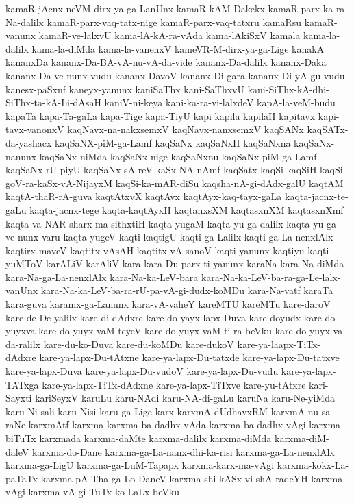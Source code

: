 {kamaR-jAcnx-neVM-dirx-ya-ga-LanUnx
kamaR-kAM-Dakekx
kamaR-parx-ka-ra-Na-dalilx
kamaR-parx-vaq-tatx-nige
kamaR-parx-vaq-tatxru
kamaRsu
kamaR-vanunx
kamaR-ve-lalxvU
kama-lA-kA-ra-vAda
kama-lAkiSxV
kamala
kama-la-dalilx
kama-la-diMda
kama-la-vanenxV
kameVR-M-dirx-ya-ga-Lige
kanakA
kananxDa
kananx-Da-BA-vA-nu-vA-da-vide
kananx-Da-dalilx
kananx-Daka
kananx-Da-ve-nunx-vudu
kananx-DavoV
kananx-Di-gara
kananx-Di-yA-gu-vudu
kanesx-paSxnf
kaneyx-yanunx
kaniSaThx
kani-SaThxvU
kani-SiThx-kA-dhi-SiThx-ta-kA-Li-dAsaH
kaniV-ni-keya
kani-ka-ra-vi-lalxdeV
kapA-la-veM-budu
kapaTa
kapa-Ta-gaLa
kapa-Tige
kapa-TiyU
kapi
kapila
kapilaH
kapitavx
kapi-tavx-vanonxV
kaqNavx-na-nakxsemxV
kaqNavx-nanxsemxV
kaqSANx
kaqSATx-da-yashacx
kaqSaNX-piM-ga-Lamf
kaqSaNx
kaqSaNxH
kaqSaNxna
kaqSaNx-nanunx
kaqSaNx-niMda
kaqSaNx-nige
kaqSaNxnu
kaqSaNx-piM-ga-Lamf
kaqSaNx-rU-piyU
kaqSaNx-sA-reV-kaSx-NA-nAmf
kaqSatx
kaqSi
kaqSiH
kaqSi-goV-ra-kaSx-vA-NijayxM
kaqSi-ka-mAR-diSu
kaqsha-nA-gi-dAdx-galU
kaqtAM
kaqtA-thaR-rA-guva
kaqtAtxvX
kaqtAvx
kaqtAyx-kaq-tayx-gaLa
kaqta-jacnx-te-gaLu
kaqta-jacnx-tege
kaqta-kaqtAyxH
kaqtanxsXM
kaqtasxnXM
kaqtasxnXmf
kaqta-va-NAR-sharx-ma-sithxtiH
kaqta-yugaM
kaqta-yu-ga-dalilx
kaqta-yu-ga-ve-nunx-varu
kaqta-yugeV
kaqti
kaqtigU
kaqti-ga-Lalilx
kaqti-ga-La-nenxlAlx
kaqtirx-maveV
kaqtitx-vAsAH
kaqtitx-vA-sanoV
kaqti-yanunx
kaqtiyu
kaqti-yuMToV
karALiV
karAliV
kara
kara-Du-parx-ti-yanunx
karaNa
kara-Na-diMda
kara-Na-ga-La-nenxlAlx
kara-Na-ka-LeV-bara
kara-Na-ka-LeV-ba-ra-ga-Le-lalx-vanUnx
kara-Na-ka-LeV-ba-ra-rU-pa-vA-gi-dudx-koMDu
kara-Na-vatf
karaTa
kara-guva
karamx-ga-Lanunx
kara-vA-vaheY
kareMTU
kareMTu
kare-daroV
kare-de-De-yalilx
kare-di-dAdxre
kare-do-yayx-lapx-Duva
kare-doyudx
kare-do-yuyxva
kare-do-yuyx-vaM-teyeV
kare-do-yuyx-vaM-ti-ra-beVku
kare-do-yuyx-va-da-ralilx
kare-du-ko-Duva
kare-du-koMDu
kare-dukoV
kare-ya-laapx-TiTx-dAdxre
kare-ya-lapx-Du-tAtxne
kare-ya-lapx-Du-tatxde
kare-ya-lapx-Du-tatxve
kare-ya-lapx-Duva
kare-ya-lapx-Du-vudoV
kare-ya-lapx-Du-vudu
kare-ya-lapx-TATxga
kare-ya-lapx-TiTx-dAdxne
kare-ya-lapx-TiTxve
kare-yu-tAtxre
kari-Sayxti
kariSeyxV
karuLu
karu-NAdi
karu-NA-di-gaLu
karuNa
karu-Ne-yiMda
karu-Ni-sali
karu-Nisi
karu-ga-Lige
karx
karxmA-dUdhavxRM
karxmA-nu-sa-raNe
karxmAtf
karxma
karxma-ba-dadhx-vAda
karxma-ba-dadhx-vAgi
karxma-biTuTx
karxmada
karxma-daMte
karxma-dalilx
karxma-diMda
karxma-diM-daleV
karxma-do-Dane
karxma-ga-La-nanx-dhi-ka-risi
karxma-ga-La-nenxlAlx
karxma-ga-LigU
karxma-ga-LuM-Tapapx
karxma-karx-ma-vAgi
karxma-kokx-La-paTaTx
karxma-pA-Tha-ga-Lo-DaneV
karxma-shi-kASx-vi-shA-radeYH
karxma-vAgi
karxma-vA-gi-TuTx-ko-LaLx-beVku
}
